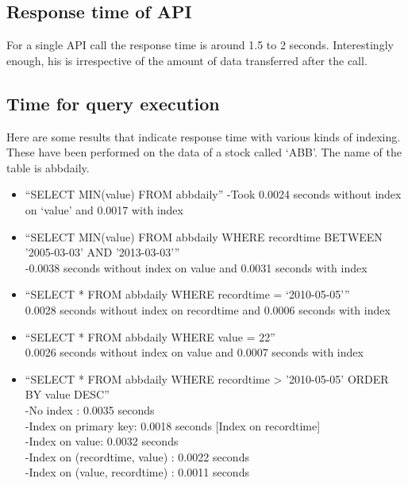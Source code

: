 \documentclass{report}
\begin{document}
\subsection{Response time of API}
For a single API call the response time is around 1.5 to 2 seconds. Interestingly enough, his is
irrespective of the amount of data transferred after the call.
\subsection{Time for query execution}
Here are some results that indicate response time with various kinds of indexing. These have been performed on the data of a stock called ‘ABB’. The name of the table is abbdaily.

\begin{itemize}

\item “SELECT MIN(value) FROM abbdaily”
-Took 0.0024 seconds without index on ‘value’ and 0.0017 with index\\

\item “SELECT MIN(value) FROM abbdaily WHERE recordtime BETWEEN '2005-03-03' AND '2013-03-03'”\\
 -0.0038 seconds without index on value and 0.0031 seconds with index\\
 
\item “SELECT * FROM abbdaily WHERE recordtime = ‘2010-05-05’”\\
0.0028 seconds without index on recordtime and 0.0006 seconds with index\\

\item “SELECT * FROM abbdaily WHERE value = 22”\\
0.0026 seconds without index on value and 0.0007 seconds with index\\

\item “SELECT * FROM abbdaily WHERE recordtime > '2010-05-05' ORDER BY value DESC”\\
-No index : 0.0035 seconds\\
-Index on primary key: 0.0018 seconds [Index on recordtime]\\
-Index on value: 0.0032 seconds\\
-Index on (recordtime, value) : 0.0022 seconds\\
-Index on (value, recordtime) : 0.0011 seconds\\


\end{itemize}
\end{document}
